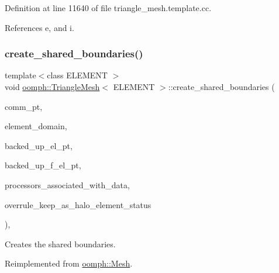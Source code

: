 Definition at line 11640 of file triangle\+\_\+mesh.\+template.\+cc.



References e, and i.

\mbox{\label{classoomph_1_1TriangleMesh_a2e26905533350a8cc0e47ed3260054e2}} 
\subsubsection{\texorpdfstring{create\+\_\+shared\+\_\+boundaries()}{create\_shared\_boundaries()}}
{\footnotesize\ttfamily template$<$class E\+L\+E\+M\+E\+NT $>$ \\
void \hyperlink{classoomph_1_1TriangleMesh}{oomph\+::\+Triangle\+Mesh}$<$ E\+L\+E\+M\+E\+NT $>$\+::create\+\_\+shared\+\_\+boundaries (\begin{DoxyParamCaption}\item[{\hyperlink{classoomph_1_1OomphCommunicator}{Oomph\+Communicator} $\ast$}]{comm\+\_\+pt,  }\item[{const \hyperlink{classoomph_1_1Vector}{Vector}$<$ unsigned $>$ \&}]{element\+\_\+domain,  }\item[{const \hyperlink{classoomph_1_1Vector}{Vector}$<$ \hyperlink{classoomph_1_1GeneralisedElement}{Generalised\+Element} $\ast$$>$ \&}]{backed\+\_\+up\+\_\+el\+\_\+pt,  }\item[{const \hyperlink{classoomph_1_1Vector}{Vector}$<$ \hyperlink{classoomph_1_1FiniteElement}{Finite\+Element} $\ast$$>$ \&}]{backed\+\_\+up\+\_\+f\+\_\+el\+\_\+pt,  }\item[{std\+::map$<$ \hyperlink{classoomph_1_1Data}{Data} $\ast$, std\+::set$<$ unsigned $>$ $>$ \&}]{processors\+\_\+associated\+\_\+with\+\_\+data,  }\item[{const bool \&}]{overrule\+\_\+keep\+\_\+as\+\_\+halo\+\_\+element\+\_\+status }\end{DoxyParamCaption})\hspace{0.3cm}{\ttfamily [protected]}, {\ttfamily [virtual]}}



Creates the shared boundaries. 



Reimplemented from \hyperlink{classoomph_1_1Mesh_ab065ae63fb5df883bdf6bd1dfe112b9c}{oomph\+::\+Mesh}.



